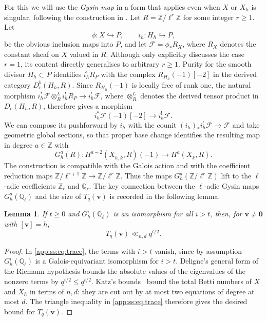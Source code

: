 \documentclass[a4paper,11pt, twoside,reqno]{amsart}
\theoremstyle{plain}
\newtheorem{lemma}[thm]{Lemma}
\theoremstyle{definition}
\theoremstyle{remark}
\newcommand{\bfv}{\bm{v}}
\newcommand{\ZZ}{\mathbb{Z}}
\newcommand{\QQ}{\mathbb{Q}}
\renewcommand{\bar}{\overline}
\renewcommand{\leq}{\leqslant}
\renewcommand{\ge}{\geqslant}
\renewcommand{\geq}{\geqslant}
\numberwithin{equation}{section}
\begin{document}
For this we will use the \emph{Gysin map} in a form that applies even when $X$ or $X_h$
is singular, following the construction in \cite[\S2.1]{RS}.
Let $R = \ZZ/\ell^r\ZZ$ for some integer $r\geq1$.
Let
$$\phi:X\hookrightarrow P,
\qquad i_h:H_h\hookrightarrow P,$$
be the obvious inclusion maps into $P$,
and let $\mathcal F=\phi_*R_X$,
where $R_X$ denotes the constant sheaf on $X$ valued in $R$.
Although \cite[\S2.1]{RS} only explicitly discusses the case $r=1$,
its content directly generalises to arbitrary $r\ge 1$.
Purity for the smooth divisor $H_h\subset P$ identifies
$i_h^!R_P$ with the complex $R_{H_h}(-1)[-2]$
in the derived category $D^b_c(H_h,R)$.
Since $R_{H_h}(-1)$ is locally free of rank one,
the natural morphism
$i_h^*\mathcal F\otimes_R^L i_h^!R_P\to i_h^!\mathcal F$,
where $\otimes_R^L$ denotes the derived tensor product in $D_c(H_h,R)$,
therefore gives a morphism
\begin{equation}
\label{EQ:derived-gysin-map}
i_h^*\mathcal F(-1)[-2]\longrightarrow i_h^!\mathcal F.
\end{equation}
We can compose its pushforward by $i_h$
with the counit $(i_h)_*i_h^!\mathcal F\to \mathcal F$
and take geometric global sections, so that proper base change
identifies the resulting map in degree $a\in \ZZ$ with
\begin{equation*}
G_h^a(R):H^{a-2}(X_{h,\bar k},R)(-1)
\longrightarrow H^a(X_{\bar k},R).
\end{equation*}
The construction is compatible
with the Galois action
and with the coefficient reduction maps $\ZZ/\ell^{r+1}\ZZ\to\ZZ/\ell^r\ZZ$.
Thus the maps $G_h^a(\ZZ/\ell^r\ZZ)$
lift to the $\ell$-adic coefficients $\ZZ_\ell$ and $\QQ_\ell$.
The key connection between the $\ell$-adic Gysin maps $G_h^a(\QQ_\ell)$
and the size of $T_q(\bfv)$ is recorded in the following lemma.
\begin{lemma}\label{app:ss:lem:reduction}
If $t\geq0$
and $G_h^i(\QQ_\ell)$ is an isomorphism for all $i>t$, then,
for $\bfv\neq\bm0$ with $[\bfv]=h$,
\[
 T_q(\bfv)\ll_{n,d} q^{t/2}.
\]
\end{lemma}
\begin{proof}
In \eqref{app:ss:eq:trace}, the terms with $i>t$ vanish, since by assumption $G^i_h(\QQ_\ell)$ is a Galois-equivariant isomorphism for $i>t$.
Deligne's general form of the Riemann hypothesis \cite[Th\'eor\`eme 3.3.1]{Del} bounds the
absolute values of the eigenvalues of the nonzero terms by
$q^{i/2}\leq q^{t/2}$.
Katz's bounds~\cite[Theorem~3 and its corollary]{KatzBetti}
bound the total Betti numbers of $X$ and $X_h$ in terms of $n,d$:
they are cut out by at most two equations of degree at most $d$.
The triangle inequality in \eqref{app:ss:eq:trace}
therefore gives the desired bound for $T_q(\bfv)$.
\end{proof}
\end{document}
